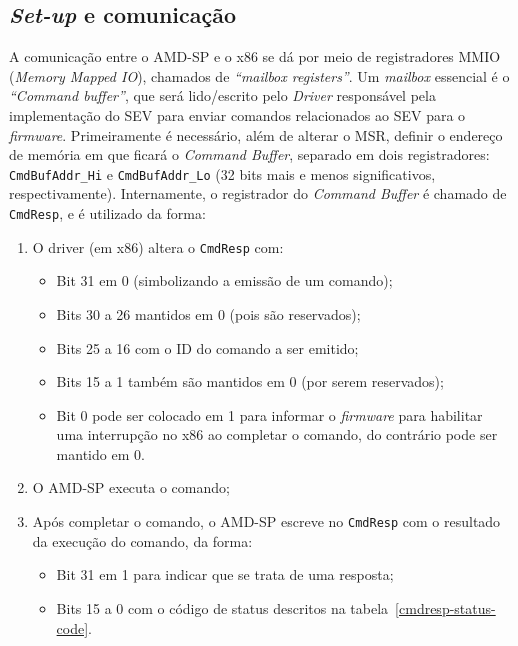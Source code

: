 \documentclass{report}
\begin{document}
\subsection{\textit{Set-up} e comunicação}



A comunicação entre o AMD-SP e o x86 se dá por meio de registradores MMIO
(\textit{Memory Mapped IO}), chamados de \textit{``mailbox registers''}. Um
\textit{mailbox} essencial é o \textit{``Command buffer''}, que será
lido/escrito pelo \textit{Driver} responsável pela implementação do SEV para
enviar comandos relacionados ao SEV para o \textit{firmware}. Primeiramente é
necessário, além de alterar o MSR, definir o endereço de memória em que ficará
o \textit{Command Buffer}, separado em dois registradores:
\texttt{CmdBufAddr\_Hi} e \texttt{CmdBufAddr\_Lo} (32 bits mais e menos
significativos, respectivamente).  Internamente, o registrador do
\textit{Command Buffer} é chamado de \texttt{CmdResp}, e é utilizado da forma:

\begin{enumerate}
    \item O driver (em x86) altera o \texttt{CmdResp} com:
        \begin{itemize}
            \item Bit 31 em 0 (simbolizando a emissão de um comando);
            \item Bits 30 a 26 mantidos em 0 (pois são reservados);
            \item Bits 25 a 16 com o ID do comando a ser emitido;
            \item Bits 15 a 1 também são mantidos em 0 (por serem reservados);
            \item Bit 0 pode ser colocado em 1 para informar o
                \textit{firmware} para habilitar uma interrupção no x86 ao
                completar o comando, do contrário pode ser mantido em 0.
        \end{itemize}
    \item O AMD-SP executa o comando;
    \item Após completar o comando, o AMD-SP escreve no \texttt{CmdResp} com o
        resultado da execução do comando, da forma:
        \begin{itemize}
            \item Bit 31 em 1 para indicar que se trata de uma resposta;
            \item Bits 15 a 0 com o código de status descritos na
                tabela~\ref{cmdresp-status-code}.
        \end{itemize}
\end{enumerate}
\end{document}
